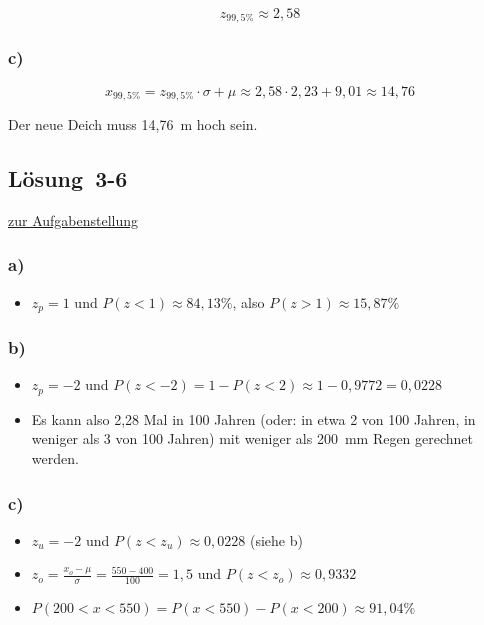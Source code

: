 \documentclass[
  11pt,
  ngerman,
  a4paper,
]{report}
\providecommand{\tightlist}{%
  \setlength{\itemsep}{0pt}\setlength{\parskip}{0pt}}
\begin{document}
\[z_{99,5\%}\approx2,58\]

\hypertarget{c-10}{%
\subsubsection{c)}\label{c-10}}

\[x_{99,5\%}=z_{99,5\%}\cdot\sigma + \mu\approx2,58\cdot2,23+9,01\approx14,76\]

Der neue Deich muss 14,76~m hoch sein.

\hypertarget{loesung-3-6}{%
\subsection{Lösung~3-6}\label{loesung-3-6}}

\protect\hyperlink{aufgabe-3-6}{zur Aufgabenstellung}

\hypertarget{a-13}{%
\subsubsection{a)}\label{a-13}}

\begin{itemize}
\tightlist
\item
  \(z_p=1\) und \(P(z<1)\approx84,13\%\), also \(P(z>1)\approx15,87\%\)
\end{itemize}

\hypertarget{b-13}{%
\subsubsection{b)}\label{b-13}}

\begin{itemize}
\tightlist
\item
  \(z_p=-2\) und \(P(z<-2) = 1-P(z<2) \approx 1-0,9772 = 0,0228\)
\item
  Es kann also 2,28 Mal in 100 Jahren (oder: in etwa 2 von 100 Jahren, in weniger als 3 von 100 Jahren) mit weniger als 200~mm Regen gerechnet werden.
\end{itemize}

\hypertarget{c-11}{%
\subsubsection{c)}\label{c-11}}

\begin{itemize}
\tightlist
\item
  \(z_u=-2\) und \(P(z<z_u)\approx 0,0228\) (siehe b)
\item
  \(z_o=\frac{x_o- \mu}{\sigma}=\frac{550-400}{100}=1,5\) und \(P(z<z_o) \approx 0,9332\)
\item
  \(P(200 < x < 550) = P(x < 550) - P(x<200) \approx 91,04\%\)
\end{itemize}
\end{document}
